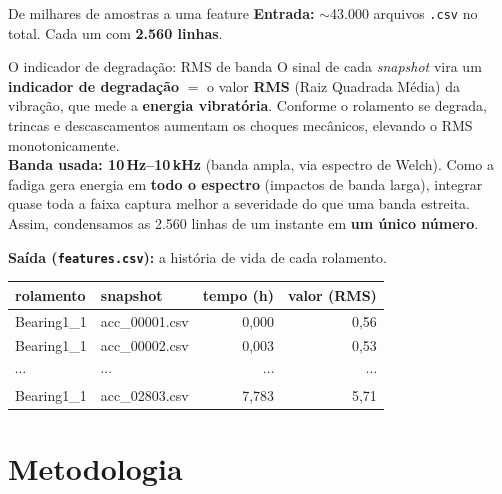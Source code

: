 \documentclass{beamer}
\begin{document}
\begin{frame}{De milhares de amostras a uma feature}
    \footnotesize
    \textbf{Entrada:} $\sim$43.000 arquivos \texttt{.csv} no total. Cada um com \textbf{2.560 linhas}.
    \vspace{0.1cm}

    \begin{block}{O indicador de degradação: RMS de banda}
        O sinal de cada \textit{snapshot} vira um \textbf{indicador de degradação} $=$ o valor \textbf{RMS} (Raiz Quadrada Média) da vibração, que mede a \textbf{energia vibratória}. Conforme o rolamento se degrada, trincas e descascamentos aumentam os choques mecânicos, elevando o RMS monotonicamente.\\[3pt]
        \textbf{Banda usada: 10\,Hz--10\,kHz} (banda ampla, via espectro de Welch). Como a fadiga gera energia em \textbf{todo o espectro} (impactos de banda larga), integrar quase toda a faixa captura melhor a severidade do que uma banda estreita.\\[3pt]
        Assim, condensamos as 2.560 linhas de um instante em \textbf{um único número}.
    \end{block}
    \vspace{0.1cm}
    \textbf{Saída (\texttt{features.csv}):} a história de vida de cada rolamento.
    \vspace{0.05cm}

    \begin{tabular}{llrr}
        \toprule
        \textbf{rolamento} & \textbf{snapshot} & \textbf{tempo (h)} & \textbf{valor (RMS)} \\
        \midrule
        Bearing1\_1 & acc\_00001.csv & 0,000 & 0,56 \\
        Bearing1\_1 & acc\_00002.csv & 0,003 & 0,53 \\
        $\cdots$ & $\cdots$ & $\cdots$ & $\cdots$ \\
        Bearing1\_1 & acc\_02803.csv & 7,783 & 5,71 \\
        \bottomrule
    \end{tabular}
    \normalsize
\end{frame}

\section{Metodologia}
\end{document}
